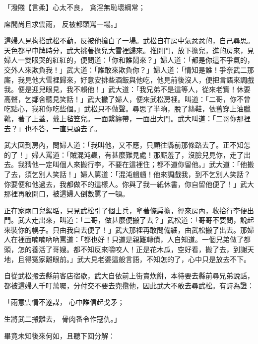 「潑賤【言柔】心太不良，  貪淫無恥壞綱常；

席間尚且求雲雨，  反被都頭罵一場。」

這婦人見抅搭武松不動，反被他搶白了一場。武松自在房中氣忿忿的，自己尋思。天色都早申牌時分，武大挑著擔兒大雪裡歸來。推開門，放下擔兒，進的房來，見婦人一雙眼哭的紅紅的，便問道：「你和誰鬧來？」婦人道：「都是你這不爭氣的，交外人來欺負我！」武大道：「誰敢來欺負你？」婦人道：「情知是誰！爭奈武二那廝，我見他大雪裡歸來，好意安排些酒飯與他吃，他見前後沒人，便把言語來調戲我。便是迎兒眼見，我不賴他！」武大道：「我兄弟不是這等人，從來老實！休要高聲，乞鄰舍聽見笑話！」武大撇了婦人，便來武松房裡。叫道：「二哥，你不曾吃點心，我和你吃些個。」武松只不做聲。尋思了半晌，脫了絲鞋，依舊穿上油臘靴，著了上蓋，戴上毡笠兒。一面繫纏帶，一面出大門。武大叫道：「二哥你那裡去？」也不答，一直只顧去了。

武大回到房內，問婦人道：「我叫他，又不應，只顧往縣前那條路去了。正不知怎的了！」婦人罵道：「賊混沌蟲，有甚麼難見處！那廝羞了，沒臉兒見你，走了出去。我猜他一定叫個人來搬行李，不要在這裡住；都不道你留他。」武大道：「他搬了去，須乞別人笑話！」婦人罵道：「混沌魍魎！他來調戲我，到不乞別人笑話？你要便和他過去，我都做不的這樣人。你與了我一紙休書，你自留他便了！」武大那裡再敢開口，被這婦人倒數罵了一頓。

正在家兩口兒絮聒，只見武松引了個士兵，拿著條扁擔，徑來房內，收拾行李便出門。武大走出來，叫道：「二哥，做甚麼便搬了去？」武松道：「哥哥不要問，說起來裝你的幌子。只由我自去便了！」武大那裡再敢問備細，由武松搬了出去。那婦人在裡面喃喃吶吶罵道：「都也好！只道是親難轉債，人自知道。一個兄弟做了都頭，怎的養活了哥嫂。都不知反來嚼咬人！正是花木瓜，空好看，搬了去，到謝天地，且得冤家離眼前。」武大見老婆這般言語，不知怎的了，心中只是放去不下。

自從武松搬去縣前客店宿歇，武大自依前上街賣炊餅，本待要去縣前尋兄弟說話，都被這婦人千叮萬囑，分付交不要去兜攬他，因此武大不敢去尋武松。有詩為證：

「雨意雲情不遂謀，  心中誰信起戈矛；

生將武二搬離去，  骨肉番令作寇仇。」

畢竟未知後來何如，且聽下回分解：
